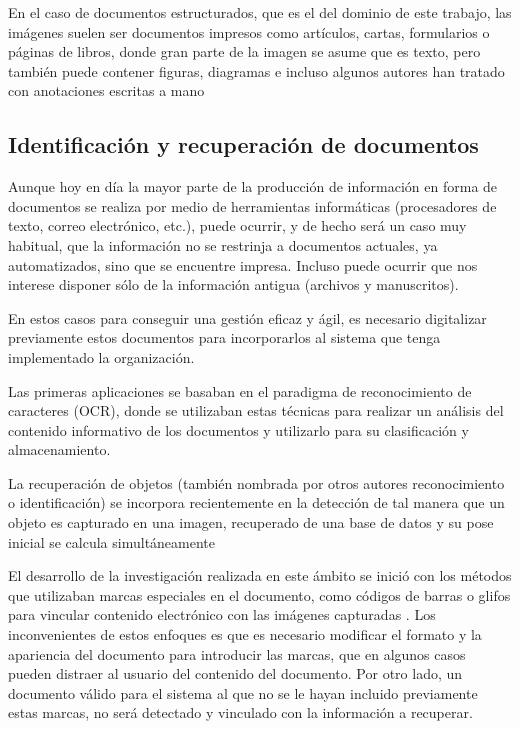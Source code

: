 En el caso de documentos estructurados, que es el del dominio de este trabajo, las imágenes suelen ser documentos impresos como artículos, cartas, formularios o páginas de libros, donde gran parte de la imagen se asume que es texto, pero también puede contener figuras, diagramas e incluso algunos autores han tratado con anotaciones escritas a mano \cite{Chen}

\subsection{Identificación y recuperación de documentos}
Aunque hoy en día la mayor parte de la producción de información en forma de documentos se realiza por medio de herramientas informáticas (procesadores de texto, correo electrónico, etc.), puede ocurrir, y de hecho será un caso muy habitual, que la información no se restrinja a documentos actuales, ya automatizados, sino que se encuentre impresa. Incluso puede ocurrir que nos interese disponer sólo de la información antigua (archivos y manuscritos).

En estos casos para conseguir una gestión eficaz y ágil, es necesario digitalizar previamente estos documentos para incorporarlos al sistema que tenga implementado la organización.

Las primeras aplicaciones se basaban en el paradigma de reconocimiento de caracteres (OCR), donde se utilizaban estas técnicas para realizar un análisis del contenido informativo de los documentos y utilizarlo para su clasificación y almacenamiento. 

La recuperación de objetos (también nombrada por otros autores reconocimiento o identificación) se incorpora recientemente en la detección de tal manera que un objeto es capturado en una imagen, recuperado de una base de datos y su pose inicial se calcula simultáneamente \cite{Pilet}

El desarrollo de la investigación realizada en este ámbito se inició con los métodos que utilizaban marcas especiales en el documento, como códigos de barras \cite{Graham} o glifos para vincular contenido electrónico con las imágenes capturadas \cite{Hecht}. Los inconvenientes de estos enfoques es que es necesario modificar el formato y la apariencia del documento para introducir las marcas, que en algunos casos pueden distraer al usuario del contenido del documento. Por otro lado, un documento válido para el sistema al que no se le hayan incluido previamente estas marcas, no será detectado y vinculado con la información a recuperar.


